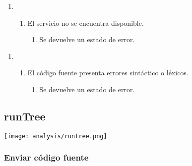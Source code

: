 \begin{description}
   \begin{enumerate} \itemsep1pt \parskip0pt 
   \setcounter{enumi}{0}
   \renewcommand{\labelenumi}{}
   \renewcommand{\labelenumiii}{\arabic{enumiii}.}
   \renewcommand{\labelenumii}{\arabic{enumi}\alph{enumii}.}
      \item 
      \begin {enumerate}
         \setcounter{enumii}{0}
         \item El servicio no se encuentra disponible.
         \begin{enumerate}
         \item Se devuelve un estado de error.
         \end{enumerate}
      \end{enumerate}
   \end{enumerate}
   \begin{enumerate} \itemsep1pt \parskip0pt 
   \setcounter{enumi}{2}
   \renewcommand{\labelenumi}{}
   \renewcommand{\labelenumiii}{\arabic{enumiii}.}
   \renewcommand{\labelenumii}{\arabic{enumi}\alph{enumii}.}
      \item 
      \begin {enumerate}
         \setcounter{enumii}{0}
         \item El código fuente presenta errores sintáctico o léxicos.
         \begin{enumerate}
         \item Se devuelve un estado de error. 
         \end{enumerate}
      \end{enumerate}
   \end{enumerate}
\end{description}



\subsection {runTree}
\begin{center}
\texttt{[image: analysis/runtree.png]}
\end{center}
\subsubsection{Enviar código fuente} 

